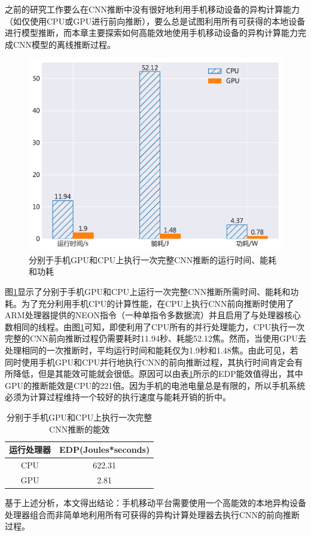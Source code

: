 之前的研究工作要么在CNN推断中没有很好地利用手机移动设备的异构计算能力（如仅使用CPU或GPU进行前向推断），要么总是试图利用所有可获得的本地设备进行模型推断，而本章主要探索如何高能效地使用手机移动设备的异构计算能力完成CNN模型的离线推断过程。

\begin{figure}[htbp]
    \centering
    \includegraphics[height=0.4\textwidth]{figures/yolo_energy.pdf}
    \caption{分别于手机GPU和CPU上执行一次完整CNN推断的运行时间、能耗和功耗}\label{figure:figure28}
\end{figure}

图\ref{figure:figure28}显示了分别于手机GPU和CPU上运行一次完整CNN推断所需时间、能耗和功耗。为了充分利用手机CPU的计算性能，在CPU上执行CNN前向推断时使用了ARM处理器提供的NEON指令（一种单指令多数据流）并且启用了与处理器核心数相同的线程。由图\ref{figure:figure28}可知，即使利用了CPU所有的并行处理能力，CPU执行一次完整的CNN前向推断过程仍需要耗时11.94秒、耗能52.12焦。然而，当使用GPU去处理相同的一次推断时，平均运行时间和能耗仅为1.9秒和1.48焦。由此可见，若同时使用手机GPU和CPU并行地执行CNN的前向推断过程，其执行时间肯定会有所降低，但是其能效可能就会很低。原因可以由表\ref{table:table9}所示的EDP能效值得出，其中GPU的推断能效是CPU的221倍。因为手机的电池电量总是有限的，所以手机系统必须为计算过程维持一个较好的执行速度与能耗开销的折中。

\begin{table}[htbp]
  \centering
  \caption{分别于手机GPU和CPU上执行一次完整CNN推断的能效}
  \label{table:table9}
  \begin{tabular}{cc}
    \toprule
      运行处理器 & EDP(Joules*seconds) \\
    \midrule
      CPU & 622.31 \\
      GPU & 2.81 \\
    \bottomrule
  \end{tabular}
\end{table}

基于上述分析，本文得出结论：手机移动平台需要使用一个高能效的本地异构设备处理器组合而非简单地利用所有可获得的异构计算处理器去执行CNN的前向推断过程。

